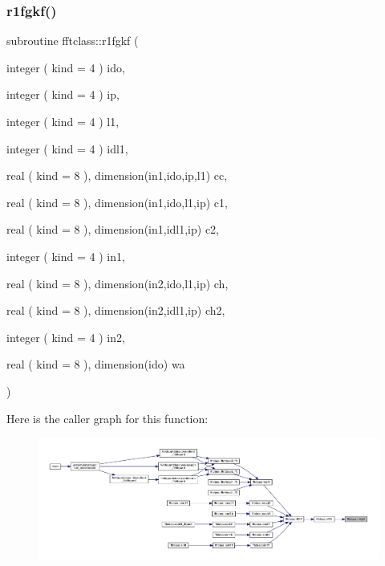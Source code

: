 \subsubsection{\texorpdfstring{r1fgkf()}{r1fgkf()}}
{\footnotesize\ttfamily subroutine fftclass\+::r1fgkf (\begin{DoxyParamCaption}\item[{integer ( kind = 4 )}]{ido,  }\item[{integer ( kind = 4 )}]{ip,  }\item[{integer ( kind = 4 )}]{l1,  }\item[{integer ( kind = 4 )}]{idl1,  }\item[{real ( kind = 8 ), dimension(in1,ido,ip,l1)}]{cc,  }\item[{real ( kind = 8 ), dimension(in1,ido,l1,ip)}]{c1,  }\item[{real ( kind = 8 ), dimension(in1,idl1,ip)}]{c2,  }\item[{integer ( kind = 4 )}]{in1,  }\item[{real ( kind = 8 ), dimension(in2,ido,l1,ip)}]{ch,  }\item[{real ( kind = 8 ), dimension(in2,idl1,ip)}]{ch2,  }\item[{integer ( kind = 4 )}]{in2,  }\item[{real ( kind = 8 ), dimension(ido)}]{wa }\end{DoxyParamCaption})}

Here is the caller graph for this function\+:\nopagebreak
\begin{figure}[H]
\begin{center}
\leavevmode
\includegraphics[width=350pt]{namespacefftclass_adb327056327448d0a605271d57091578_icgraph}
\end{center}
\end{figure}
\mbox{\label{namespacefftclass_a6d2b5609d651241869584e962d234756}} 

